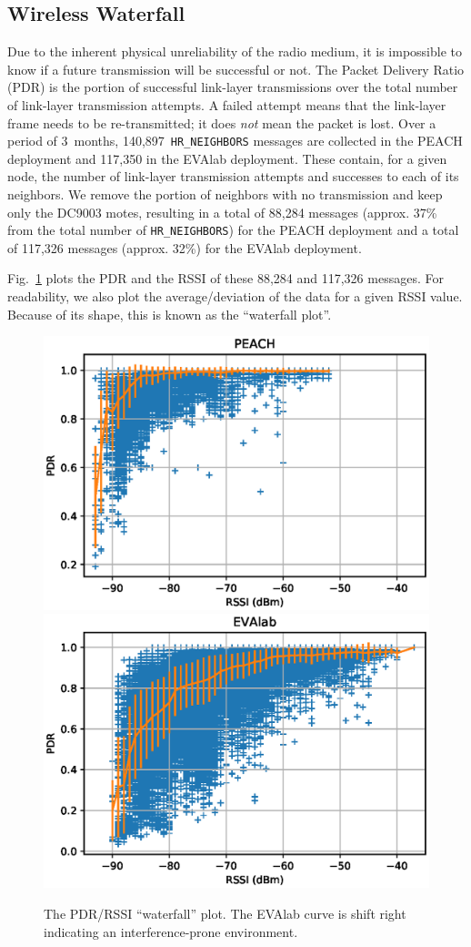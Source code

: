 \documentclass{elsarticle}
\newcommand{\HRNEIGHBORS}         {{\tt HR\_NEIGHBORS}\xspace}
\newcommand{\PEACHNUMHRNEIGHBORS} {140,897\xspace}
\newcommand{\EVANUMHRNEIGHBORS}   {117,350\xspace}
\begin{document}
\subsection{Wireless Waterfall}
\label{sec:waterfall}


Due to the inherent physical unreliability of the radio medium, it is impossible to know if a future transmission will be successful or not.
The Packet Delivery Ratio (PDR) is the portion of successful link-layer transmissions over the total number of link-layer transmission attempts.
A failed attempt means that the link-layer frame needs to be re-transmitted; it does \textit{not} mean the packet is lost.
Over a period of 3~months, \PEACHNUMHRNEIGHBORS~\HRNEIGHBORS messages are collected in the PEACH deployment and \EVANUMHRNEIGHBORS in the EVAlab deployment.
These contain, for a given node, the number of link-layer transmission attempts and successes to each of its neighbors.
We remove the portion of neighbors with no transmission and keep only the DC9003 motes, resulting in a total of 88,284 messages (approx. 37\% from the total number of \HRNEIGHBORS) for the PEACH deployment and a total of 117,326 messages (approx. 32\%) for the EVAlab deployment.


Fig.~\ref{fig:waterfall} plots the PDR and the RSSI of these 88,284 and 117,326 messages.
For readability, we also plot the average/deviation of the data for a given RSSI value.
Because of its shape, this is known as the ``waterfall plot''.

\begin{figure}
    \includegraphics[width=0.5\columnwidth]{waterfall_peach.eps}
    \includegraphics[width=0.5\columnwidth]{waterfall.eps}  
    \caption{
        The PDR/RSSI ``waterfall'' plot. The EVAlab curve is shift right indicating an interference-prone environment.
    }
    \label{fig:waterfall}
\end{figure}
\end{document}
